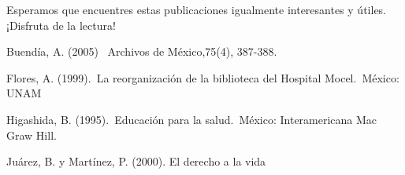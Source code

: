\documentclass[
  jou,
  floatsintext,
  longtable,
  a4paper,
  nolmodern,
  notxfonts,
  notimes,
  12pt,
  colorlinks=true,linkcolor=blue,citecolor=blue,urlcolor=blue]{apa7}
\begin{document}
Esperamos que encuentres estas publicaciones igualmente interesantes y
útiles. ¡Disfruta de la lectura!

Buendía, A. (2005) ~Archivos de México,75(4), 387-388.

Flores, A. (1999).~La reorganización de la biblioteca del Hospital
Mocel.~México: UNAM

Higashida, B. (1995).~Educación para la salud.~México: Interamericana
Mac Graw Hill.

Juárez, B. y Martínez, P. (2000). El derecho a la vida
\end{document}
